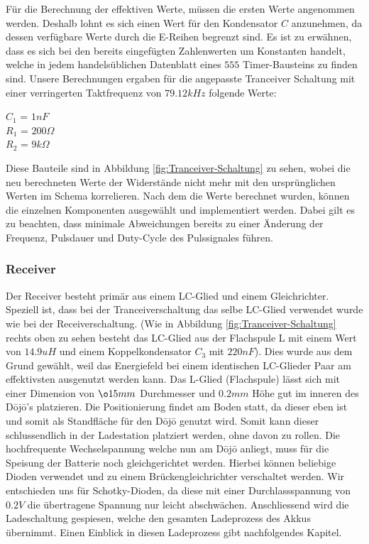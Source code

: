 Für die Berechnung der effektiven Werte, müssen die ersten Werte angenommen werden. Deshalb lohnt es sich einen Wert für den Kondensator $C$ anzunehmen, da dessen verfügbare Werte durch die E-Reihen begrenzt sind. Es ist zu erwähnen, dass es sich bei den bereits eingefügten Zahlenwerten um Konstanten handelt, welche in jedem handelsüblichen Datenblatt eines $555$ Timer-Bausteins zu finden sind. Unsere Berechnungen ergaben für die angepasste Tranceiver Schaltung mit einer verringerten Taktfrequenz von $79.12 kHz$ folgende Werte:

\begin{center}
$C_{1}$ = $1nF$\\
$R_{1}$ = $200\Omega$\\
$R_{2}$ = $9k\Omega$\\
\end{center}

Diese Bauteile sind in Abbildung \ref{fig:Tranceiver-Schaltung} zu sehen, wobei die neu berechneten Werte der Widerstände nicht mehr mit den ursprünglichen Werten im Schema korrelieren.
Nach dem die Werte berechnet wurden, können die einzelnen Komponenten ausgewählt und implementiert werden. Dabei gilt es zu beachten, dass minimale Abweichungen bereits zu einer Änderung der Frequenz, Pulsdauer und Duty-Cycle des Pulssignales führen.

\subsubsection*{Receiver}
Der Receiver besteht primär aus einem LC-Glied und einem Gleichrichter. Speziell ist, dass bei der Tranceiverschaltung das selbe LC-Glied verwendet wurde wie bei der Receiverschaltung. (Wie in Abbildung \ref{fig:Tranceiver-Schaltung} rechts oben zu sehen besteht das LC-Glied aus der Flachspule L mit einem Wert von $14.9uH$ und einem Koppelkondensator $C_{3}$ mit $220nF$). Dies wurde aus dem Grund gewählt, weil das Energiefeld bei einem identischen LC-Glieder Paar am effektivsten ausgenutzt werden kann. Das L-Glied (Flachspule) lässt sich mit einer Dimension von $\o 15mm$ Durchmesser und $0.2mm$ Höhe gut im inneren des Dōjō’s platzieren. Die Positionierung findet am Boden statt, da dieser eben ist und somit als Standfläche für den Dōjō genutzt wird. Somit kann dieser schlussendlich in der Ladestation platziert werden, ohne davon zu rollen. Die hochfrequente Wechselspannung welche nun am Dōjō anliegt, muss für die Speisung der Batterie noch gleichgerichtet werden. Hierbei können beliebige Dioden verwendet und zu einem Brückengleichrichter verschaltet werden. Wir entschieden uns für Schotky-Dioden, da diese mit einer Durchlassspannung von $0.2V$ die übertragene Spannung nur leicht abschwächen. Anschliessend wird die Ladeschaltung gespiesen, welche den gesamten Ladeprozess des Akkus übernimmt. Einen Einblick in diesen Ladeprozess gibt nachfolgendes Kapitel.


